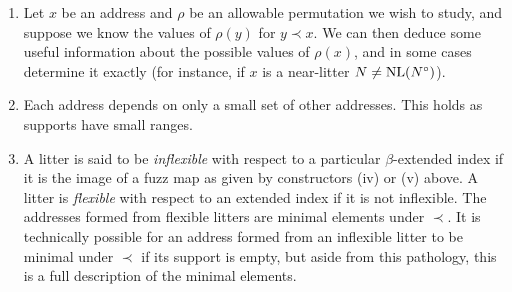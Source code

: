 \begin{remarks}
    \begin{enumerate}
        \item Let \( x \) be an address and \( \rho \) be an allowable permutation we wish to study, and suppose we know the values of \( \rho(y) \) for \( y \prec x \).
        We can then deduce some useful information about the possible values of \( \rho(x) \), and in some cases determine it exactly (for instance, if \( x \) is a near-litter \( N \neq \operatorname{NL}(N^\circ) \)).
        \item Each address depends on only a small set of other addresses.
        This holds as supports have small ranges.
        \item A litter is said to be \emph{inflexible} with respect to a particular \( \beta \)-extended index if it is the image of a fuzz map as given by constructors (iv) or (v) above.
        A litter is \emph{flexible} with respect to an extended index if it is not inflexible.
        The addresses formed from flexible litters are minimal elements under \( \prec \).
        It is technically possible for an address formed from an inflexible litter to be minimal under \( \prec \) if its support is empty, but aside from this pathology, this is a full description of the minimal elements.
    \end{enumerate}
\end{remarks}


